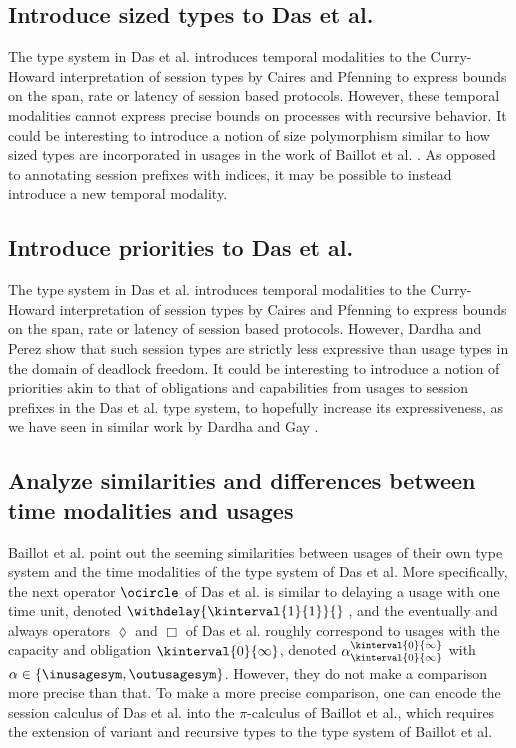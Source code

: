 \subsection*{Introduce sized types to Das et al.}
The type system in Das et al. \cite{DasEtAl2018} introduces temporal modalities to the Curry-Howard interpretation of session types by Caires and Pfenning \cite{CairesPfenning2010} to express bounds on the span, rate or latency of session based protocols. However, these temporal modalities cannot express precise bounds on processes with recursive behavior. It could be interesting to introduce a notion of size polymorphism similar to how sized types are incorporated in usages in the work of Baillot et al. \cite{BaillotEtAl2021}. As opposed to annotating session prefixes with indices, it may be possible to instead introduce a new temporal modality.

\subsection*{Introduce priorities to Das et al.}
The type system in Das et al. \cite{DasEtAl2018} introduces temporal modalities to the Curry-Howard interpretation of session types by Caires and Pfenning \cite{CairesPfenning2010} to express bounds on the span, rate or latency of session based protocols. However, Dardha and Perez \cite{DardhaPerezComparison} show that such session types are strictly less expressive than usage types in the domain of deadlock freedom. It could be interesting to introduce a notion of priorities akin to that of obligations and capabilities from usages to session prefixes in the Das et al. type system, to hopefully increase its expressiveness, as we have seen in similar work by Dardha and Gay \cite{DardhaGay2018}.

\subsection*{Analyze similarities and differences between time modalities and usages}
Baillot et al. \cite{BaillotEtAl2021} point out the seeming similarities between usages of their own type system and the time modalities of the type system of Das et al. More specifically, the next operator $\ocircle$ of Das et al. is similar to delaying a usage with one time unit, denoted $\withdelay{\kinterval{1}{1}}{}\;$, and the eventually and always operators $\lozenge$ and $\Box$ of Das et al. roughly correspond to usages with the capacity and obligation $\kinterval{0}{\infty}$, denoted $\alpha^{\kinterval{0}{\infty}}_{\kinterval{0}{\infty}}$ with $\alpha \in \{\inusagesym,\outusagesym \}$. However, they do not make a comparison more precise than that. To make a more precise comparison, one can encode the session calculus of Das et al. into the $\pi$-calculus of Baillot et al., which requires the extension of variant and recursive types to the type system of Baillot et al.



